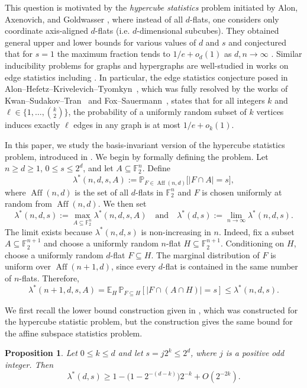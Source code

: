 \documentclass[10pt,a4paper]{amsart}
\newtheorem{proposition}[theorem]{Proposition}
\newcommand{\F}{\mathbb F}
\newcommand{\E}{\mathbb E}
\renewcommand{\P}{\mathbb P}
\DeclareMathOperator{\Aff}{Aff}
\begin{document}
This question is motivated by the {\em hypercube statistics} problem initiated by Alon, Axenovich, and
Goldwasser \cite{AlonAxenovichGoldwasser2024}, where instead of all $d$-flats, one considers only coordinate axis-aligned $d$-flats (i.e. $d$-dimensional subcubes). They obtained general upper and lower bounds for various values of $d$ and $s$ and conjectured that for $s=1$ the maximum fraction tends to $1/e+o_d(1)$ as $d,n \to \infty$ . Similar inducibility problems for graphs and hypergraphs are well-studied in works on edge statistics including \cite{AlonHefetzKrivelevichTyomkyn2020,KwanSudakovTran2019,MartinssonMoussetNoeverTrujic2019,FoxSauermann2020,JainKwanMubayiTran2025,GrebennikovKwan2025}.
In particular, the edge statistics conjecture posed in Alon--Hefetz--Krivelevich--Tyomkyn~\cite{AlonHefetzKrivelevichTyomkyn2020}, which was fully resolved by the works of Kwan--Sudakov--Tran~\cite{KwanSudakovTran2019} and Fox--Sauermann~\cite{FoxSauermann2020}, states that for all integers $k$ and $\ell \in \{1, \dots, {k\choose 2}\}$, the probability of a uniformly random subset of $k$ vertices induces exactly $\ell$ edges in any graph is at most $1/e+o_k(1)$. 


In this paper, we study the basis-invariant version of the hypercube statistics problem, introduced in \cite{Xu2026}. We begin by formally defining the problem. Let $n\ge d\ge1$, $0\le s\le2^d$, and
let $A\subseteq\F_2^n$. Define
\[\lambda^*(n,d,s,A):=\P_{F\in\Aff(n,d)}\bigl[|F\cap A|=s\bigr],\]
where $\Aff(n,d)$ is the set of all $d$-flats in $\F_2^{n}$ and $F$ is chosen uniformly at random from $\Aff(n,d)$. We then set
\[\lambda^*(n,d,s):=\max_{A\subseteq\F_2^n}\lambda^*(n,d,s,A)\quad\text{and}\quad \lambda^*(d,s):=\lim_{n\to\infty}\lambda^*(n,d,s).\]
The limit exists because $\lambda^*(n,d,s)$ is non-increasing in $n$. Indeed, fix a subset $A\subseteq\F_2^{n+1}$ and choose a uniformly random $n$-flat $H\subseteq\F_2^{n+1}$. Conditioning on $H$, choose a uniformly
random $d$-flat $F\subseteq H$. The marginal distribution of $F$ is uniform over $\Aff(n+1,d)$, since every $d$-flat is contained in the same
number of $n$-flats. Therefore,
\[\lambda^*(n+1,d,s,A)=\E_H\,\P_{F\subseteq H}[|F\cap(A\cap H)|=s]\le\lambda^*(n,d,s).\] 

We first recall the lower bound construction given in \cite{AlonAxenovichGoldwasser2024}, which was constructed for the hypercube statistic problem, but the construction gives the same bound for the affine subspace statistics problem. 

\begin{proposition}\label{prop:lower}
Let $0\le k\le d$ and let $s=j2^k\le2^d$, where $j$ is a positive odd
integer.  Then
\begin{equation}\label{eq:lambda}
  \lambda^*(d,s)\ge  1-\bigl(1-2^{-(d-k)}\bigr)2^{-k}+O(2^{-2k}).  
\end{equation}
\end{proposition}
\end{document}
